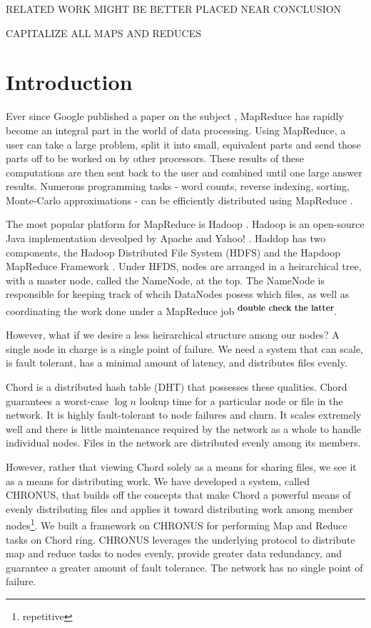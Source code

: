 \documentclass[conference, compsocconf, letterpaper]{IEEEtran}
\begin{document}
RELATED WORK MIGHT BE BETTER PLACED NEAR CONCLUSION

CAPITALIZE ALL MAPS AND REDUCES

\section{Introduction}

Ever since Google published a paper on the subject \cite{mapreduce}, MapReduce has rapidly become an integral part in the world of data processing.  Using MapReduce, a user can take a large problem, split it into small, equivalent parts and send those parts off to be worked on by other processors.  These results of these computations are then sent back to the user and combined until one large answer results.  Numerous programming tasks - word counts, reverse indexing, sorting, Monte-Carlo approximations - can be efficiently distributed using MapReduce \cite{mapreduce}.

The most popular platform for MapReduce is Hadoop \cite{Hadoop}. Hadoop is an open-source Java implementation deveolped by Apache and Yahoo! \cite{pavlo2009comparison}.  Haddop has two components, the Hadoop Distributed File System (HDFS) and the Hapdoop MapReduce Framework \cite{mrsurvey}.  Under HFDS, nodes are arranged in a heirarchical tree, with a master node, called the NameNode, at the top.  The NameNode is responsible for keeping track of whcih DataNodes posess which files, as well as coordinating the work done under a MapReduce job \textsuperscript{\textbf{double check the latter}}. 
 
However, what if we desire a less heirarchical structure among our nodes?  A single node in charge is a single point of failure.  We need a system that can scale, is fault tolerant, has a minimal amount of latency, and distributes files evenly. 

Chord \cite{Chord} is a distributed hash table (DHT) that possesses these qualities.  Chord guarantees a worst-case $\log n$ lookup time for a particular node or file in the network. It is highly fault-tolerant to node failures and churn.  It scales extremely well and there is little maintenance required by the network as a whole to handle individual nodes.  Files in the network are distributed evenly among its members.
 
However, rather that viewing Chord solely as a means for sharing files, we see it as a means for distributing work.  We have developed a system, called CHRONUS, that builds off the concepts that make Chord a powerful means of evenly distributing files and applies it toward distributing work among member nodes\footnote{repetitive}.  We built a framework on CHRONUS for performing Map and Reduce tasks on Chord ring.  CHRONUS leverages the underlying protocol to distribute map and reduce tasks to nodes evenly, provide greater data redundancy, and guarantee a greater amount of fault tolerance.  The network has no single point of failure.
\end{document}

